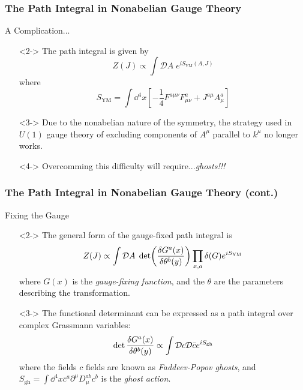 \documentclass{beamer}
\begin{document}
\begin{frame}
    \frametitle{The Path Integral in Nonabelian Gauge Theory}
    \alert{A Complication...}
    \begin{itemize}
        \item[\textbullet]<2-> The path integral is given by \[ Z(J) \propto \int\mathcal{D}A \; e^{iS_\text{YM}(A,J)} \] where \[ S_\text{YM} = \int\dd^4x\left[-\frac{1}{4}F^{a\mu\nu}F_{\mu\nu}^a + J^{a\mu}A_\mu^a\right] \]
        \item[\textbullet]<3-> Due to the nonabelian nature of the symmetry, the strategy used in $U(1)$ gauge theory of excluding components of $A^\mu$ parallel to $k^\mu$ no longer works.
        \item[\textbullet]<4-> Overcomming this difficulty will require...\textit{ghosts!!!}
    \end{itemize}
\end{frame}

\begin{frame}
    \frametitle{The Path Integral in Nonabelian Gauge Theory (cont.)}
    \alert{Fixing the Gauge}
    \begin{itemize}
        \item[\textbullet]<2-> The general form of the gauge-fixed path integral is \[ Z(J) \propto \int\mathcal{D}A \; \det(\fdv{G^a(x)}{\theta^b(y)})\prod_{x,a}\delta(G)e^{iS_\text{YM}} \] where $G(x)$ is the \textit{gauge-fixing function}, and the $\theta$ are the parameters describing the transformation.
        \item[\textbullet]<3-> The functional determinant can be expressed as a path integral over complex Grassmann variables: \[ \det\fdv{G^a(x)}{\theta^b(y)} \propto \int\mathcal{D}c\mathcal{D}\bar{c}e^{iS_\text{gh}} \] where the fields $c$ fields are known as \textit{Faddeev-Popov ghosts}, and $S_\text{gh} = \int\dd^4x \bar{c}^a\partial^\mu D_\mu^{ab}c^b$ is the \textit{ghost action}.
    \end{itemize}
\end{frame}
\end{document}
